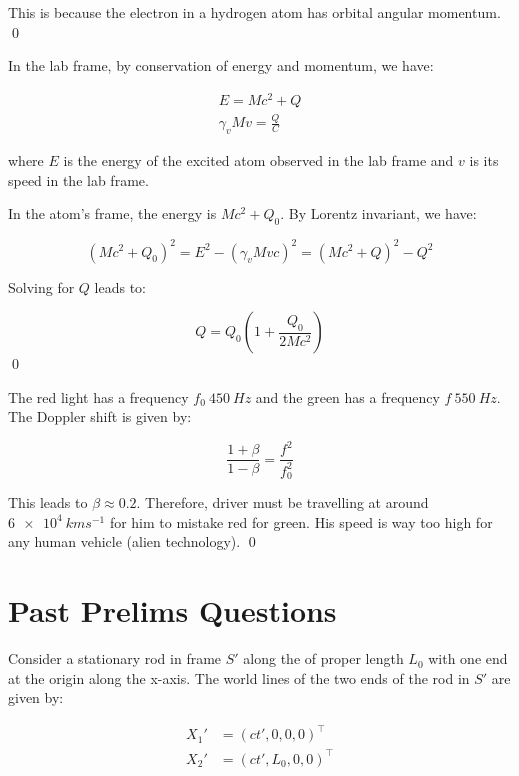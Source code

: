 \documentclass[12pt]{article}
\begin{document}
This is because the electron in a hydrogen atom has orbital angular momentum.
\qed


In the lab frame, by conservation of energy and momentum, we have:

\begin{equation}
\begin{split}
    E = Mc^{2} + Q \\
    \gamma_{v} M v = \frac{Q}{C} 
\end{split}
\end{equation}

where $E$ is the energy of the excited atom observed in the lab frame and $v$ is its speed in the lab frame.

In the atom's frame, the energy is $Mc^{2} + Q_{0}$. By Lorentz invariant, we have:

\begin{equation}
    (Mc^{2} + Q_{0})^{2} = E^{2} - (\gamma_{v} M v c)^{2} = (Mc^{2} + Q)^{2} - Q^{2}
\end{equation}

Solving for $Q$ leads to:

\begin{equation}
    Q = Q_{0} \left( 1 + \frac{Q_{0}}{2Mc^{2}} \right)
\end{equation}
\qed


The red light has a frequency $f_{0} ~ \qty{450}{Hz}$ and the green has a frequency $f ~ \qty{550}{Hz}$. The Doppler shift is given by:

\begin{equation}
    \frac{1 + \beta}{1 - \beta} = \frac{f^{2}}{f_{0}^{2}}
\end{equation}

This leads to $\beta \approx 0.2$. Therefore, driver must be travelling at around $\qty{6e4}{km s^{-1}}$ for him to mistake red for green. His speed is way too high for any human vehicle (alien technology).
\qed


\pagebreak
\section*{Past Prelims Questions}


Consider a stationary rod in frame $S'$ along the of proper length $L_{0}$ with one end at the origin along the x-axis. The world lines of the two ends of the rod in $S'$ are given by:

\begin{equation}
\begin{split}
    X_{1}' &= (ct', 0, 0, 0)^{\intercal} \\
    X_{2}' &= (ct', L_{0}, 0, 0)^{\intercal}
\end{split}
\end{equation}
\end{document}
